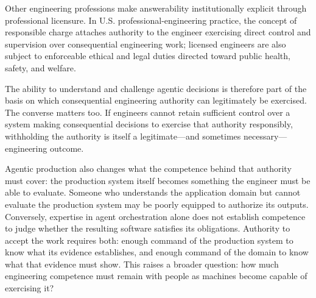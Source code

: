 
Other engineering professions make answerability institutionally explicit through professional licensure. In U.S. professional-engineering practice, the concept of responsible charge attaches authority to the engineer exercising direct control and supervision over consequential engineering work; licensed engineers are also subject to enforceable ethical and legal duties directed toward public health, safety, and welfare.



The ability to understand and challenge agentic decisions is therefore part of the basis on which consequential engineering authority can legitimately be exercised. The converse matters too. If engineers cannot retain sufficient control over a system making consequential decisions to exercise that authority responsibly, withholding the authority is itself a legitimate---and sometimes necessary---engineering outcome.


Agentic production also changes what the competence behind that authority must cover: the production system itself becomes something the engineer must be able to evaluate. Someone who understands the application domain but cannot evaluate the production system may be poorly equipped to authorize its outputs. Conversely, expertise in agent orchestration alone does not establish competence to judge whether the resulting software satisfies its obligations. Authority to accept the work requires both: enough command of the production system to know what its evidence establishes, and enough command of the domain to know what that evidence must show. This raises a broader question: how much engineering competence must remain with people as machines become capable of exercising it?

